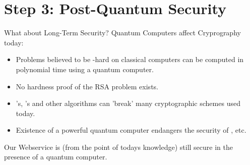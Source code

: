 \section{Step 3: Post-Quantum Security}
\begin{frame}{What about Long-Term Security?}
  Quantum Computers affect Cryprography today:
  \begin{itemize}
    \item Problems believed to be -hard on classical computers can be computed in polynomial time using a quantum computer.
    \item No hardness proof of the RSA problem exists.
    \item {}'s, 's and other algorithms can 'break' many cryptographic schemes used today.
    \item Existence of a powerful quantum computer endangers the security of , etc.
  \end{itemize}
  Our Webservice is (from the point of todays knowledge) still secure in the presence of a quantum computer.
\end{frame}
